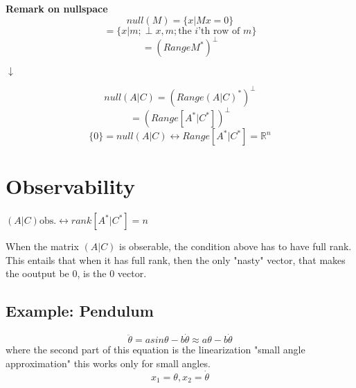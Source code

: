 \documentclass[a4paper]{article}
\begin{document}
\textbf{Remark on nullspace} 
\begin{equation}
	null(M) = \{x | M x = 0 \}
\end{equation}
\begin{equation}
	= \{x | m; \perp x, m; \text{the $i$'th row of $m$} \}
\end{equation}
\begin{equation}
= (Range M^{*})^{\perp} 
\end{equation}

 $ \downarrow $

\begin{equation}
null(A|C) = (Range(A|C)^{*} )^{\perp} 
\end{equation}
\begin{equation}
	= (Range[A^{*}|C^{*} ])^{\perp} 
\end{equation}
\begin{equation}
	\{0\} = null(A|C) \leftrightarrow Range[A^{*} |C^{*}] = \mathbb{R}^{n} 
\end{equation}


\section{Observability}

\begin{framed}
	$ (A|C) \text{obs.} \leftrightarrow rank[A^{*}|C^{*}] = n $
\end{framed}
When the matrix $ (A|C) $ is obserable, the condition above has to have full rank. This entails that when it has full rank, then the only "nasty" vector, that makes the ooutput be 0, is the 0 vector.

\subsection{Example: Pendulum}
\begin{equation}
\ddot{\theta} = a sin \theta - b \dot{\theta} \approx a \theta - b \dot{\theta}
\end{equation}
where the second part of this equation is the linearization "small angle approximation" this works only for small angles. 
\begin{equation}
x_1 = \theta, x_2 = \dot{\theta}
\end{equation}
\end{document}
